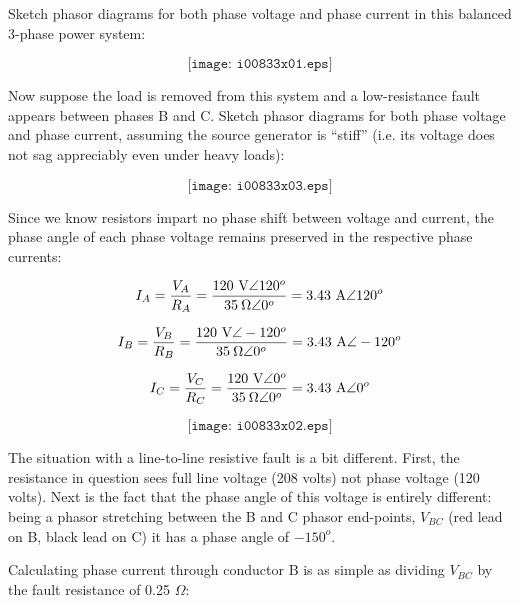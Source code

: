 

Sketch phasor diagrams for both phase voltage and phase current in this balanced 3-phase power system:

$$\texttt{[image: i00833x01.eps]}$$

\vskip 10pt

Now suppose the load is removed from this system and a low-resistance fault appears between phases B and C.  Sketch phasor diagrams for both phase voltage and phase current, assuming the source generator is ``stiff'' (i.e. its voltage does not sag appreciably even under heavy loads):

$$\texttt{[image: i00833x03.eps]}$$







Since we know resistors impart no phase shift between voltage and current, the phase angle of each phase voltage remains preserved in the respective phase currents:

$$I_A = {V_A \over R_A} = {120 \hbox{ V} \angle 120^o \over 35 \> \Omega \angle 0^o} = 3.43 \hbox{ A} \angle 120^o$$

$$I_B = {V_B \over R_B} = {120 \hbox{ V} \angle -120^o \over 35 \> \Omega \angle 0^o} = 3.43 \hbox{ A} \angle -120^o$$

$$I_C = {V_C \over R_C} = {120 \hbox{ V} \angle 0^o \over 35 \> \Omega \angle 0^o} = 3.43 \hbox{ A} \angle 0^o$$

$$\texttt{[image: i00833x02.eps]}$$

\vskip 10pt

\filbreak

The situation with a line-to-line resistive fault is a bit different.  First, the resistance in question sees full line voltage (208 volts) not phase voltage (120 volts).  Next is the fact that the phase angle of this voltage is entirely different: being a phasor stretching between the B and C phasor end-points, $V_{BC}$ (red lead on B, black lead on C) it has a phase angle of $-150^o$.

Calculating phase current through conductor B is as simple as dividing $V_{BC}$ by the fault resistance of 0.25 $\Omega$:

